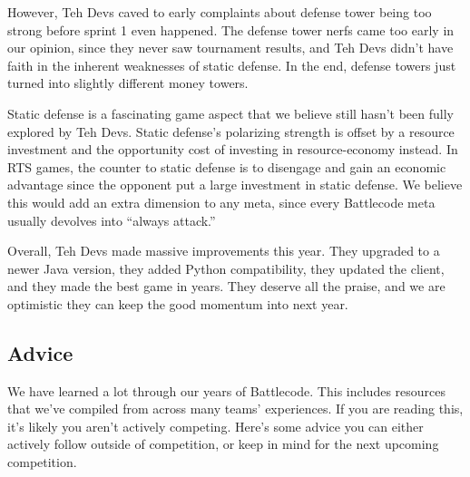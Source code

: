 \medskip

However, Teh Devs caved to early complaints about defense tower being too strong before sprint 1 even happened. The defense tower nerfs came too early in our opinion, since they never saw tournament results, and Teh Devs didn't have faith in the inherent weaknesses of static defense. In the end, defense towers just turned into slightly different money towers.

\medskip

Static defense is a fascinating game aspect that we believe still hasn't been fully explored by Teh Devs. Static defense's polarizing strength is offset by a resource investment and the opportunity cost of investing in resource-economy instead. In RTS games, the counter to static defense is to disengage and gain an economic advantage since the opponent put a large investment in static defense. We believe this would add an extra dimension to any meta, since every Battlecode meta usually devolves into ``always attack.''

\medskip

Overall, Teh Devs made massive improvements this year. They upgraded to a newer Java version, they added Python compatibility, they updated the client, and they made the best game in years. They deserve all the praise, and we are optimistic they can keep the good momentum into next year.

\subsection{Advice}

We have learned a lot through our years of Battlecode. This includes resources that we've compiled from across many teams' experiences. If you are reading this, it's likely you aren't actively competing. Here's some advice you can either actively follow outside of competition, or keep in mind for the next upcoming competition.

